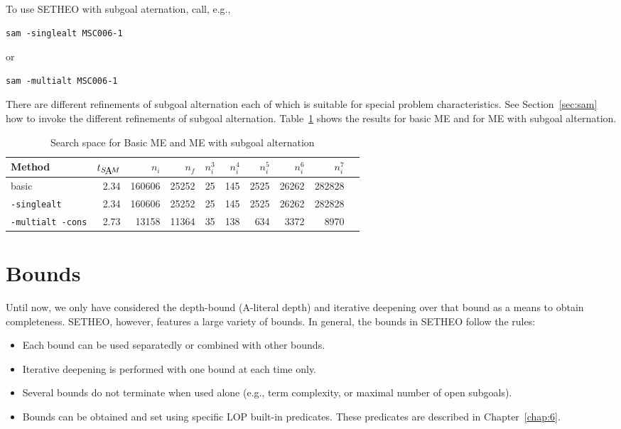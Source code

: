 To use SETHEO with subgoal aternation, call, e.g.,
\begin{center}
\begin{verbatim}
sam -singlealt MSC006-1
\end{verbatim}
\end{center}
or
\begin{center}
\begin{verbatim}
sam -multialt MSC006-1
\end{verbatim}
\end{center}
There are different refinements of subgoal alternation each of which
is suitable for special problem characteristics. 
See Section~\ref{sec:sam} how to invoke the different refinements of
subgoal alternation.
Table~\ref{tab:tut2:results.delay} shows the results for basic
ME and for ME with subgoal alternation.

\begin{table}[htb]
\begin{center}
\begin{tabular}{|l|r|r|r||r|r|r|r|r|r|}
\hline
Method & $t_{\SAM}$ & $n_i$ & $n_f$ & 
	$n_i^3$ & $n_i^4$ & $n_i^5$ & $n_i^6$ & $n_i^7$ \\
\hline\hline
basic & 2.34 & 160606 & 25252 &
	25 & 145 & 2525 & 26262 & 282828 \\
\hline
{\tt -singlealt} & 2.34 & 160606 & 25252 &
	25 & 145 & 2525 & 26262 & 282828 \\
\hline
{\tt -multialt -cons} & 2.73 & 13158 & 11364 &
	35 & 138 & 634 & 3372 & 8970 \\
\hline\hline
\end{tabular}
\end{center}
\caption{Search space for Basic ME and ME with subgoal alternation}  
\label{tab:tut2:results.delay}
\end{table}


\section{Bounds}
\label{sec:tut2:bounds}

Until now, we only have considered the depth-bound (A-literal depth)
and iterative deepening over that bound as a means to obtain completeness.
SETHEO, however, features a large variety of bounds.
In general, the bounds in SETHEO follow the rules:
\begin{itemize}
\item
Each bound can be used separatedly or combined with other bounds.
\item
Iterative deepening is performed with one bound at each time only.
\item
Several bounds do not terminate when used alone (e.g., term complexity,
or maximal number of open subgoals).
\item
Bounds can be obtained and set using specific LOP built-in predicates.
These predicates are described in Chapter~\ref{chap:6}.
\end{itemize}

